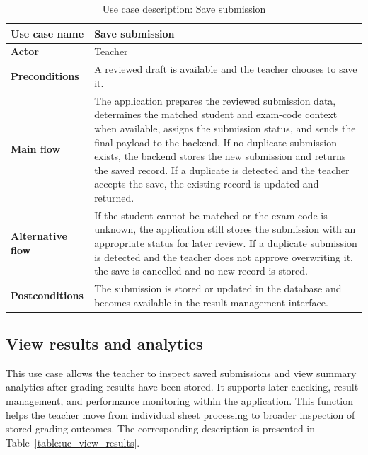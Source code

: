 \documentclass[../Main.tex]{subfiles}
\begin{document}
\begin{table}[H]
    \centering
    \caption{Use case description: Save submission}
    \label{table:uc_save_submission}
    \renewcommand{\arraystretch}{1.25}
    \begin{tabular}{|p{}|p{}|}
        \hline
        \textbf{Use case name} & Save submission \\
        \hline
        \textbf{Actor} & Teacher \\
        \hline
        \textbf{Preconditions} & A reviewed draft is available and the teacher chooses to save it. \\
        \hline
        \textbf{Main flow} & The application prepares the reviewed submission data, determines the matched student and exam-code context when available, assigns the submission status, and sends the final payload to the backend. If no duplicate submission exists, the backend stores the new submission and returns the saved record. If a duplicate is detected and the teacher accepts the save, the existing record is updated and returned. \\
        \hline
        \textbf{Alternative flow} & If the student cannot be matched or the exam code is unknown, the application still stores the submission with an appropriate status for later review. If a duplicate submission is detected and the teacher does not approve overwriting it, the save is cancelled and no new record is stored. \\
        \hline
        \textbf{Postconditions} & The submission is stored or updated in the database and becomes available in the result-management interface. \\
        \hline
    \end{tabular}
\end{table}

\subsection{View results and analytics}
\label{subsection:2.3.6}

This use case allows the teacher to inspect saved submissions and view summary
analytics after grading results have been stored. It supports later checking,
result management, and performance monitoring within the application. This
function helps the teacher move from individual sheet processing to broader
inspection of stored grading outcomes. The corresponding description is
presented in Table~\ref{table:uc_view_results}.
\end{document}
